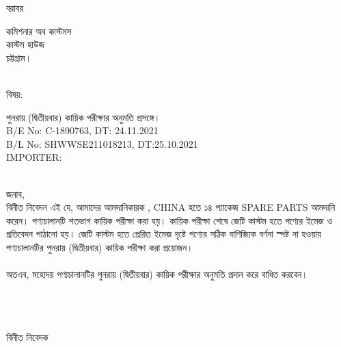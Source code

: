 \documentclass[12pt]{article}
\newcommand{\beno}{C-1890763}
\newcommand{\bedt}{24.11.2021}
\newcommand{\blno}{SHWWSE211018213}
\newcommand{\bldt}{25.10.2021}
\newcommand{\good}{SPARE PARTS}
\newcommand{\co}{CHINA}
\newcommand{\impn}{\htf}
\begin{document}
\fontsize{14pt}{14pt}\selectfont
\noindent
বরাবর
\\
\begin{minipage}[t]{0.06\linewidth}
\hspace{1em}
\end{minipage}
\begin{minipage}[t]{0.94\linewidth}
কমিশনার অব কাস্টমস
\\
কাস্টম হাউজ
\\
চট্টগ্রাম।
\\
\\
\end{minipage}
\begin{minipage}[t]{0.06\linewidth}
বিষয়:
\end{minipage}
\begin{minipage}[t]{0.94\linewidth}
পুনরায় (দ্বিতীয়বার) কায়িক পরীক্ষার অনুমতি প্রসঙ্গে।
\\
B/E No: {\beno}, DT: {\bedt}
\\
B/L No: {\blno}, DT:{\bldt}
\\
IMPORTER: {\impn}
\\
\\
\end{minipage}
জনাব,
\\
\hspace*{2.7em}বিনীত নিবেদন এই যে, আমাদের আমদানিকারক {\impn},
{\co} হতে ১৪ প্যাকেজ {\good}
আমদানি করেন।
পণ্যচালানটি শতভাগ কায়িক পরীক্ষা
করা হয়। কায়িক পরীক্ষা শেষে
জেটি কাস্টম হতে
পণ্যের ইমেজ ও প্রতিবেদন পাঠানো হয়।
জেটি কাস্টম হতে প্রেরিত ইমেজ দৃষ্টে
পণ্যের সঠিক বাণিজ্যিক বর্ণনা স্পষ্ট না
হওয়ায় পণ্যচালানটির পুনরায় (দ্বিতীয়বার)
কায়িক পরীক্ষা করা প্রয়োজন।
\\
\\
অতএব, মহোদয়
পণ্যচালানটির পুনরায় (দ্বিতীয়বার)
কায়িক পরীক্ষার অনুমতি প্রদান করে
বাধিত করবেন।
\\
\\
\\
\\
\begin{minipage}[t]{0.50\linewidth}
\hspace{1em}
\end{minipage}
\begin{minipage}[t]{0.60\linewidth}
বিনীত নিবেদক
\\
\\
\\
\\
\\
{\cnfn}
\end{minipage}
\thispagestyle{laststyle}
\end{document}
